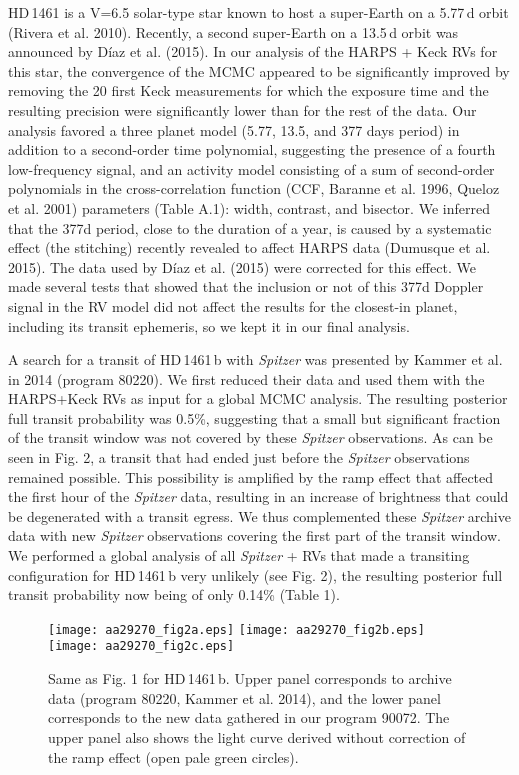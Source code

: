 \documentclass[traditabstract]{aa}
\begin{document}
HD\,1461 is a V=6.5 solar-type star known to host a super-Earth on a 5.77\,d orbit (Rivera et al. 2010). Recently,
a second super-Earth on a 13.5\,d orbit was announced by D\'iaz  et al. (2015).
In our analysis of the HARPS + Keck RVs for this star, the convergence of the MCMC  appeared to be significantly improved 
by removing the 20 first Keck measurements for which the exposure time and the resulting precision were
 significantly lower than for the rest of the data. Our analysis favored a three planet  model (5.77, 13.5, and 377 
 days period) in addition to a second-order time polynomial, suggesting the presence of a fourth low-frequency signal, 
 and an activity model consisting of a sum of second-order polynomials in the  cross-correlation function (CCF, Baranne et al. 1996,
  Queloz et al. 2001) parameters (Table A.1): width, contrast, and bisector. We inferred that the 377d period, close to the duration of a year, is caused by a systematic effect (the stitching) recently revealed to affect HARPS data (Dumusque et al. 2015). The data used by D\'iaz  et al. (2015) were corrected for this effect. We made several tests that showed that the  inclusion or not of this 377d Doppler signal in the RV model did not affect the results for the closest-in  planet, including its transit ephemeris,  so we kept it in our final analysis. 
 
 A search for a transit of HD\,1461\,b with {\it Spitzer} was  presented by Kammer et al. in 2014 (program 80220). 
 We first reduced their data and used them with the HARPS+Keck RVs as input for a global MCMC analysis. The
 resulting  posterior full transit probability was 0.5\%, suggesting that  a small but significant fraction of  the transit window 
 was not covered by these {\it Spitzer} observations. As can be seen in Fig. 2, a transit that had ended just before the 
 {\it Spitzer} observations remained possible.  This possibility is amplified by the ramp effect that affected the first hour 
 of the {\it Spitzer} data, resulting in an increase of brightness that could be degenerated with a transit egress. 
 We thus complemented these {\it Spitzer} archive data with new {\it Spitzer} observations covering the first part of the 
 transit window. We performed a global analysis of all {\it Spitzer} + RVs that made  a  transiting configuration 
 for HD\,1461\,b very unlikely (see Fig. 2), the resulting posterior full transit probability now being of only 0.14\% (Table 1). 
 
\begin{figure}
\label{fig:2}
\centering                     
\texttt{[image: aa29270\_fig2a.eps]}
\texttt{[image: aa29270\_fig2b.eps]}
\texttt{[image: aa29270\_fig2c.eps]}
\caption{Same as Fig. 1 for HD\,1461\,b. Upper panel corresponds to archive data (program 80220, Kammer et al. 2014), and the lower panel corresponds to the new data gathered in our program 90072. The upper panel also shows the light curve derived without correction of the ramp effect (open pale green circles).  }
\end{figure} 
\end{document}
